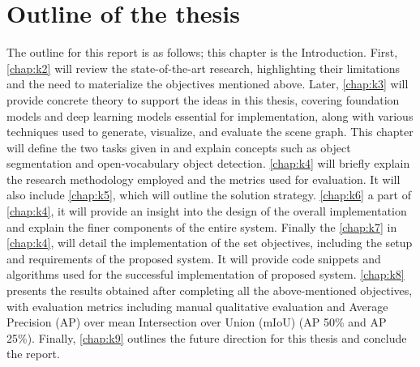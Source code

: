 \section{Outline of the thesis}	
The outline for this report is as follows; this chapter is the Introduction. 
First, \cref{chap:k2} will review the state-of-the-art research, highlighting their limitations and the need to materialize the objectives mentioned above. 
Later, \cref{chap:k3} will provide concrete theory to support the ideas in this thesis, covering foundation models and deep learning models essential for 
implementation, along with various techniques used to generate, visualize, and evaluate the scene graph. This chapter will define the two tasks given in 
\cite{delitzas2024scenefun3d} and explain concepts such as object segmentation and open-vocabulary object detection.
\cref{chap:k4} will briefly explain the research methodology employed and the metrics used for evaluation. It will also include 
\cref{chap:k5}, which will outline the solution strategy. \cref{chap:k6} a part of \cref{chap:k4}, it will provide an insight into the design of the overall implementation and explain the
finer components of the entire system. Finally the \cref{chap:k7} in \cref{chap:k4}, will detail the implementation of the set objectives, including the setup and requirements of 
the proposed system. It will provide code snippets and algorithms used for the successful implementation of proposed system. 
\cref{chap:k8} presents the results obtained after completing all the above-mentioned objectives, with evaluation metrics including manual qualitative 
evaluation and Average Precision (AP) over mean Intersection over Union (mIoU) (AP 50\% and AP 25\%). Finally, \cref{chap:k9} outlines the future direction for this thesis and conclude the report.



